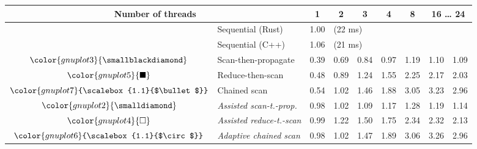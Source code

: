\begin{tabular}{clrrrrrrr}
\toprule
\multicolumn{2}{c}{\textbf{Number of threads}} & \multicolumn{1}{c}{\textbf{ 1 }} & \multicolumn{1}{c}{\textbf{ 2 }} & \multicolumn{1}{c}{\textbf{ 3 }} & \multicolumn{1}{c}{\textbf{ 4 }} & \multicolumn{1}{c}{\textbf{ 8 }} & \multicolumn{2}{c}{\textbf{ 16 } \dots \textbf{ 24 }} \\
\midrule
& Sequential (Rust) & \multicolumn{1}{r}{ 1.00 } & \multicolumn{ 6 }{l}{(22 ms)} \\
& Sequential (C++) & \multicolumn{1}{r}{ 1.06 } & \multicolumn{ 6 }{l}{(21 ms)} \\
\rowcolor{gnuplot3!10}$\color{gnuplot3}{\smallblackdiamond}$ & Scan-then-propagate & \cellcolor{gnuplot3!10} 0.39 & \cellcolor{gnuplot3!10} 0.69 & \cellcolor{gnuplot3!10} 0.84 & \cellcolor{gnuplot3!10} 0.97 & \cellcolor{gnuplot3!10} 1.19 & \cellcolor{gnuplot3!10} 1.10 & \cellcolor{gnuplot3!10} 1.09 \\
\rowcolor{gnuplot5!10}$\color{gnuplot5}{\blacksquare}$ & Reduce-then-scan & \cellcolor{gnuplot5!10} 0.48 & \cellcolor{gnuplot5!10} 0.89 & \cellcolor{gnuplot5!10} 1.24 & \cellcolor{gnuplot5!10} 1.55 & \cellcolor{gnuplot5!10} 2.25 & \cellcolor{gnuplot5!10} 2.17 & \cellcolor{gnuplot5!10} 2.03 \\
\rowcolor{gnuplot7!10}$\color{gnuplot7}{\scalebox{1.1}{$\bullet$}}$ & Chained scan & \cellcolor{gnuplot7!10} 0.54 & \cellcolor{gnuplot7!10} 1.02 & \cellcolor{gnuplot7!10} 1.46 & \cellcolor{gnuplot7!10} 1.88 & \cellcolor{gnuplot7!10} 3.05 & \cellcolor{gnuplot7!10} 3.23 & \cellcolor{gnuplot7!10} 2.96 \\
\rowcolor{gnuplot2!30}$\color{gnuplot2}{\smalldiamond}$ & \textit{Assisted scan-t.-prop.} & \cellcolor{gnuplot2!30} 0.98 & \cellcolor{gnuplot2!30} 1.02 & \cellcolor{gnuplot2!30} 1.09 & \cellcolor{gnuplot2!30} 1.17 & \cellcolor{gnuplot2!30} 1.28 & \cellcolor{gnuplot2!30} 1.19 & \cellcolor{gnuplot2!30} 1.14 \\
\rowcolor{gnuplot4!30}$\color{gnuplot4}{\square}$ & \textit{Assisted reduce-t.-scan} & \cellcolor{gnuplot4!30} 0.99 & \cellcolor{gnuplot4!30} 1.22 & \cellcolor{gnuplot4!30} 1.50 & \cellcolor{gnuplot4!30} 1.75 & \cellcolor{gnuplot4!30} 2.34 & \cellcolor{gnuplot4!30} 2.32 & \cellcolor{gnuplot4!30} 2.13 \\
\rowcolor{gnuplot6!30}$\color{gnuplot6}{\scalebox{1.1}{$\circ$}}$ & \textit{Adaptive chained scan} & \cellcolor{gnuplot6!30} 0.98 & \cellcolor{gnuplot6!30} 1.02 & \cellcolor{gnuplot6!30} 1.47 & \cellcolor{gnuplot6!30} 1.89 & \cellcolor{gnuplot6!30} 3.06 & \cellcolor{gnuplot6!30} 3.26 & \cellcolor{gnuplot6!30} 2.96 \\

\end{tabular}
